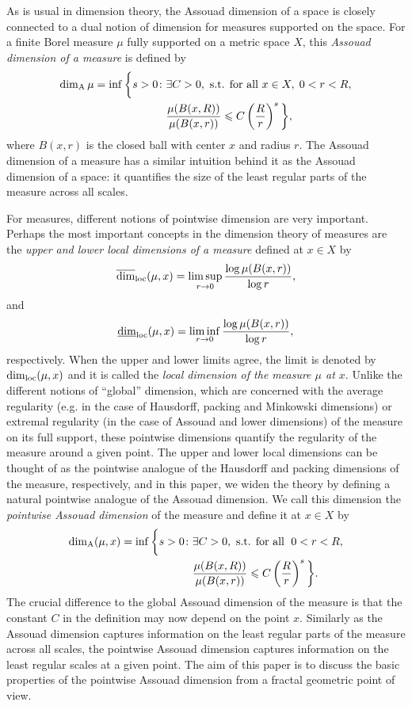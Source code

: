 \documentclass{PRM}
\newcommand{\updim}{\overline{\dim}}
\newcommand{\lowdim}{\underline{\dim}}
\newcommand{\adim}{\dim_{\mathrm{A}}}
\theoremstyle{plain}
\theoremstyle{definition}
\theoremstyle{remark}
\begin{document}
As is usual in dimension theory, the Assouad dimension of a space is closely connected to a dual notion of dimension for measures supported on the space. For a finite Borel measure $\mu$ fully supported on a metric space $X$, this \emph{Assouad dimension of a measure} is defined by
\begin{align}\label{eq:global_assouad}
    \adim \mu=\inf\bigg\{ s>0\colon& \exists C>0,\textnormal{ s.t. for all }x\in X,\; 0<r<R,\nonumber\\
    &\frac{\mu(B(x,R))}{\mu(B(x,r))}\leq C\left(\frac{R}{r}\right)^s\bigg\},
\end{align}
where $B(x,r)$ is the closed ball with center $x$ and radius $r$. The Assouad dimension of a measure has a similar intuition behind it as the Assouad dimension of a space: it quantifies the size of the least regular parts of the measure across all scales. 

For measures, different notions of pointwise dimension are very important. Perhaps the most important concepts in the dimension theory of measures are the \emph{upper and lower local dimensions of a measure} defined at $x\in X$ by
\begin{equation*}
    \updim_{\textnormal{loc}}(\mu,x)=\limsup_{r\to 0}\frac{\log \mu(B(x,r))}{\log r},
\end{equation*}
and
\begin{equation*}
    \lowdim_{\textnormal{loc}}(\mu,x)=\liminf_{r\to 0}\frac{\log \mu(B(x,r))}{\log r},
\end{equation*}
respectively. When the upper and lower limits agree, the limit is denoted by $\dim_{\textnormal{loc}}(\mu,x)$ and it is called the \emph{local dimension of the measure $\mu$ at $x$}. Unlike the different notions of ``global'' dimension, which are concerned with the average regularity (e.g. in the case of Hausdorff, packing and Minkowski dimensions) or extremal regularity (in the case of Assouad and lower dimensions) of the measure on its full support, these pointwise dimensions quantify the regularity of the measure around a given point. The upper and lower local dimensions can be thought of as the pointwise analogue of the Hausdorff and packing dimensions of the measure, respectively, and in this paper, we widen the theory by defining a natural pointwise analogue of the Assouad dimension. We call this dimension the \emph{pointwise Assouad dimension} of the measure and define it at $x\in X$ by
\begin{align*}
    \adim (\mu,x)=\inf\bigg\{ s>0\colon& \exists C>0,\textnormal{ s.t. for all }\; 0<r<R,\\
    &\frac{\mu(B(x,R))}{\mu(B(x,r))}\leq C\left(\frac{R}{r}\right)^s\bigg\}.
\end{align*}
The crucial difference to the global Assouad dimension of the measure is that the constant $C$ in the definition may now depend on the point $x$. Similarly as the Assouad dimension captures information on the least regular parts of the measure across all scales, the pointwise Assouad dimension captures information on the least regular scales at a given point. The aim of this paper is to discuss the basic properties of the pointwise Assouad dimension from a fractal geometric point of view.
\end{document}
